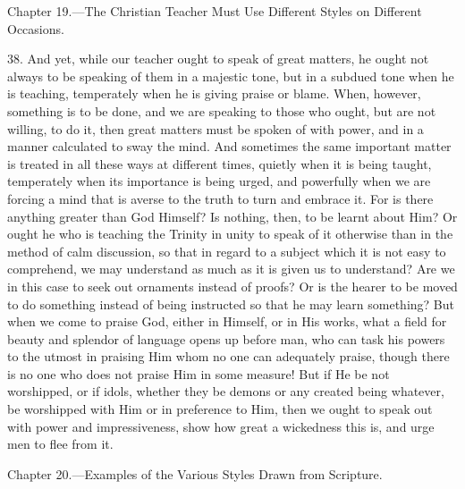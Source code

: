 
Chapter 19.—The Christian Teacher Must Use Different Styles on Different Occasions.

38. And yet, while our teacher ought to speak of great matters, he ought not always to be speaking of them in a majestic tone, but in a subdued tone when he is teaching, temperately when he is giving praise or blame. When, however, something is to be done, and we are speaking to those who ought, but are not willing, to do it, then great matters must be spoken of with power, and in a manner calculated to sway the mind. And sometimes the same important matter is treated in all these ways at different times, quietly when it is being taught, temperately when its importance is being urged, and powerfully when we are forcing a mind that is averse to the truth to turn and embrace it. For is there anything greater than God Himself? Is nothing, then, to be learnt about Him? Or ought he who is teaching the Trinity in unity to speak of it otherwise than in the method of calm discussion, so that in regard to a subject which it is not easy to comprehend, we may understand as much as it is given us to understand? Are we in this case to seek out ornaments instead of proofs? Or is the hearer to be moved to do something instead of being instructed so that he may learn something? But when we come to praise God, either in Himself, or in His works, what a field for beauty and splendor of language opens up before man, who can task his powers to the utmost in praising Him whom no one can adequately praise, though there is no one who does not praise Him in some measure! But if He be not worshipped, or if idols, whether they be demons or any created being whatever, be worshipped with Him or in preference to Him, then we ought to speak out with power and impressiveness, show how great a wickedness this is, and urge men to flee from it.


Chapter 20.—Examples of the Various Styles Drawn from Scripture.

